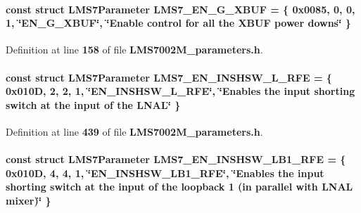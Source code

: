 \paragraph[{L\+M\+S7\+\_\+\+E\+N\+\_\+\+G\+\_\+\+X\+B\+UF}]{\setlength{\rightskip}{0pt plus 5cm}const struct {\bf L\+M\+S7\+Parameter} L\+M\+S7\+\_\+\+E\+N\+\_\+\+G\+\_\+\+X\+B\+UF = \{ 0x0085, 0, 0, 1, \char`\"{}\+E\+N\+\_\+\+G\+\_\+\+X\+B\+U\+F\char`\"{}, \char`\"{}\+Enable control for all the X\+B\+U\+F power downs\char`\"{} \}\hspace{0.3cm}{\ttfamily [static]}}\label{LMS7002M__parameters_8h_a7a54fa510da0b7528ec647d02ca1daf1}


Definition at line {\bf 158} of file {\bf L\+M\+S7002\+M\+\_\+parameters.\+h}.

\paragraph[{L\+M\+S7\+\_\+\+E\+N\+\_\+\+I\+N\+S\+H\+S\+W\+\_\+\+L\+\_\+\+R\+FE}]{\setlength{\rightskip}{0pt plus 5cm}const struct {\bf L\+M\+S7\+Parameter} L\+M\+S7\+\_\+\+E\+N\+\_\+\+I\+N\+S\+H\+S\+W\+\_\+\+L\+\_\+\+R\+FE = \{ 0x010\+D, 2, 2, 1, \char`\"{}\+E\+N\+\_\+\+I\+N\+S\+H\+S\+W\+\_\+\+L\+\_\+\+R\+F\+E\char`\"{}, \char`\"{}\+Enables the input shorting switch at the input of the L\+N\+A\+L\char`\"{} \}\hspace{0.3cm}{\ttfamily [static]}}\label{LMS7002M__parameters_8h_a8dd453f31e78341ac19b073e72e44d6c}


Definition at line {\bf 439} of file {\bf L\+M\+S7002\+M\+\_\+parameters.\+h}.

\paragraph[{L\+M\+S7\+\_\+\+E\+N\+\_\+\+I\+N\+S\+H\+S\+W\+\_\+\+L\+B1\+\_\+\+R\+FE}]{\setlength{\rightskip}{0pt plus 5cm}const struct {\bf L\+M\+S7\+Parameter} L\+M\+S7\+\_\+\+E\+N\+\_\+\+I\+N\+S\+H\+S\+W\+\_\+\+L\+B1\+\_\+\+R\+FE = \{ 0x010\+D, 4, 4, 1, \char`\"{}\+E\+N\+\_\+\+I\+N\+S\+H\+S\+W\+\_\+\+L\+B1\+\_\+\+R\+F\+E\char`\"{}, \char`\"{}\+Enables the input shorting switch at the input of the loopback 1 (in parallel with L\+N\+A\+L mixer)\char`\"{} \}\hspace{0.3cm}{\ttfamily [static]}}\label{LMS7002M__parameters_8h_a14f8d5b6a8c9509d4cce45691a9d2fec}


